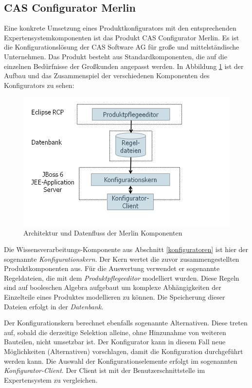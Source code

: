 \subsection{CAS Configurator Merlin} \label{configurator}
Eine konkrete Umsetzung eines Produktkonfigurators mit den entsprechenden Expertensystemkomponenten ist das Produkt CAS Configurator Merlin. Es ist die Konfigurationslösung der CAS Software AG für große und mittelständische Unternehmen. Das Produkt besteht aus Standardkomponenten, die auf die einzelnen Bedürfnisse der Großkunden angepasst werden. In Abbildung \ref{airbus_structure} ist der Aufbau und das Zusammenspiel der verschiedenen Komponenten des Konfigurators zu sehen: \par
\begin{figure}
\centering
\includegraphics[width=\hsize]{images/AirbusAufbau}
\caption{Architektur und Datenfluss der Merlin Komponenten}
\label{airbus_structure}
\end{figure}
Die Wissensverarbeitungs-Komponente aus Abschnitt \ref{konfiguratoren} ist hier der sogenannte \textit{Konfigurationskern}. Der Kern wertet die zuvor zusammengestellten Produktkomponenten aus. Für die Auswertung verwendet er sogenannte Regeldateien, die mit dem \textit{Produktpflegeeditor} modelliert wurden. Diese Regeln sind auf booleschen Algebra aufgebaut um komplexe Abhängigkeiten der Einzelteile eines Produktes modellieren zu können. Die Speicherung dieser Dateien erfolgt in der \textit{Datenbank}.
\par
 Der Konfigurationskern berechnet ebenfalls sogenannte Alternativen. Diese treten auf, sobald die derzeitige Selektion alleine, ohne Hinzunahme von weiteren Bauteilen, nicht umsetzbar ist. Der Konfigurator kann in diesem Fall neue Möglichkeiten (Alternativen) vorschlagen, damit die Konfiguration durchgeführt werden kann. Die Auswahl der Konfigurationselemente erfolgt im sogenannten \textit{Konfigurator-Client}. Der Client ist mit der Benutzerschnittstelle im Expertensystem zu vergleichen. \par


